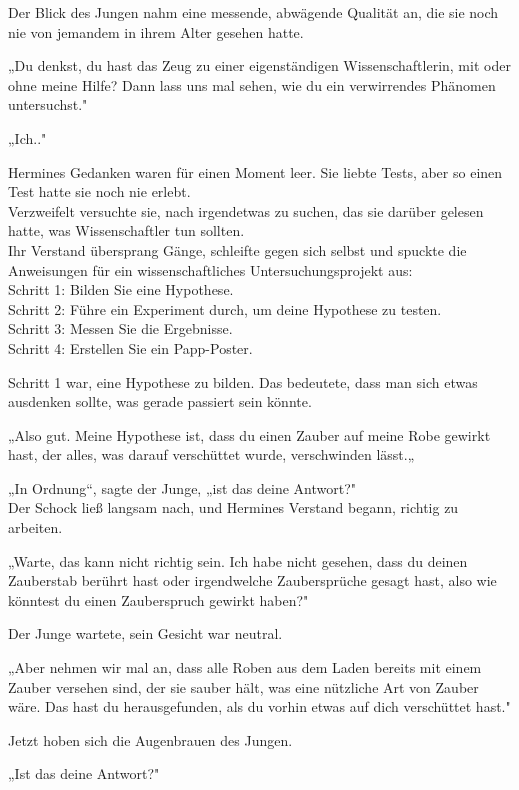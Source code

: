 {Der Blick des Jungen nahm eine messende, abwägende Qualität an, die sie noch nie von jemandem in ihrem Alter gesehen hatte.

„Du denkst, du hast das Zeug zu einer eigenständigen Wissenschaftlerin, mit oder ohne meine Hilfe? Dann lass uns mal sehen, wie du ein verwirrendes Phänomen untersuchst."

„Ich.."

Hermines Gedanken waren für einen Moment leer. Sie liebte Tests, aber so einen Test hatte sie noch nie erlebt.\\ Verzweifelt versuchte sie, nach irgendetwas zu suchen, das sie darüber gelesen hatte, was Wissenschaftler tun sollten.\\ Ihr Verstand übersprang Gänge, schleifte gegen sich selbst und spuckte die Anweisungen für ein wissenschaftliches Untersuchungsprojekt aus:\\ Schritt 1: Bilden Sie eine Hypothese.\\ Schritt 2: Führe ein Experiment durch, um deine Hypothese zu testen.\\ Schritt 3: Messen Sie die Ergebnisse.\\ Schritt 4: Erstellen Sie ein Papp-Poster.

Schritt 1 war, eine Hypothese zu bilden. Das bedeutete, dass man sich etwas ausdenken sollte, was gerade passiert sein könnte.

„Also gut. Meine Hypothese ist, dass du einen Zauber auf meine Robe gewirkt hast, der alles, was darauf verschüttet wurde, verschwinden lässt.„

„In Ordnung“, sagte der Junge, „ist das deine Antwort?"\\ Der Schock ließ langsam nach, und Hermines Verstand begann, richtig zu arbeiten.

„Warte, das kann nicht richtig sein. Ich habe nicht gesehen, dass du deinen Zauberstab berührt hast oder irgendwelche Zaubersprüche gesagt hast, also wie könntest du einen Zauberspruch gewirkt haben?"

Der Junge wartete, sein Gesicht war neutral.

„Aber nehmen wir mal an, dass alle Roben aus dem Laden bereits mit einem Zauber versehen sind, der sie sauber hält, was eine nützliche Art von Zauber wäre. Das hast du herausgefunden, als du vorhin etwas auf dich verschüttet hast."

Jetzt hoben sich die Augenbrauen des Jungen.

„Ist das deine Antwort?"

}
